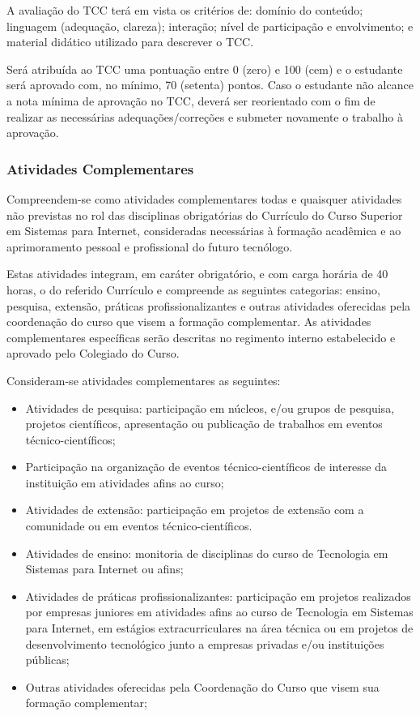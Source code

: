A avaliação do TCC terá em vista os critérios de: domínio do conteúdo; linguagem (adequação, clareza); interação; nível de participação e envolvimento; e material didático utilizado para descrever o TCC.

Será atribuída ao TCC uma pontuação entre 0 (zero) e 100 (cem) e o estudante será aprovado com, no mínimo, 70 (setenta) pontos. Caso o estudante não alcance a nota mínima de aprovação no TCC, deverá ser reorientado com o fim de realizar as necessárias adequações/correções e submeter novamente o trabalho à aprovação.

\subsubsection{Atividades Complementares}

Compreendem-se como atividades complementares todas e quaisquer atividades não previstas no rol das disciplinas obrigatórias do Currículo do Curso Superior em Sistemas para Internet, consideradas necessárias à formação acadêmica e ao aprimoramento pessoal e profissional do futuro tecnólogo.

Estas atividades integram, em caráter obrigatório, e com carga horária de 40 horas, o do referido Currículo e compreende as seguintes categorias: ensino, pesquisa, extensão, práticas profissionalizantes e outras atividades oferecidas pela coordenação do curso que visem a formação complementar. As atividades complementares específicas serão descritas no regimento interno estabelecido e aprovado pelo Colegiado do Curso.

Consideram-se atividades complementares as seguintes:

\begin{itemize}
	\item Atividades de pesquisa: participação em núcleos, e/ou grupos de pesquisa, projetos científicos, apresentação ou publicação de trabalhos em eventos técnico-científicos;
	\item Participação na organização de eventos técnico-científicos de interesse da instituição em atividades afins ao curso;
	\item Atividades de extensão: participação em projetos de extensão com a comunidade ou em eventos técnico-científicos.
	\item Atividades de ensino: monitoria de disciplinas do curso de Tecnologia em Sistemas para Internet ou afins;
	\item Atividades de práticas profissionalizantes: participação em projetos realizados por empresas juniores em atividades afins ao curso de Tecnologia em Sistemas para Internet, em estágios extracurriculares na área técnica ou em projetos de desenvolvimento tecnológico junto a empresas privadas e/ou instituições públicas;
	\item Outras atividades oferecidas pela Coordenação do Curso que visem sua formação complementar;
\end{itemize}

